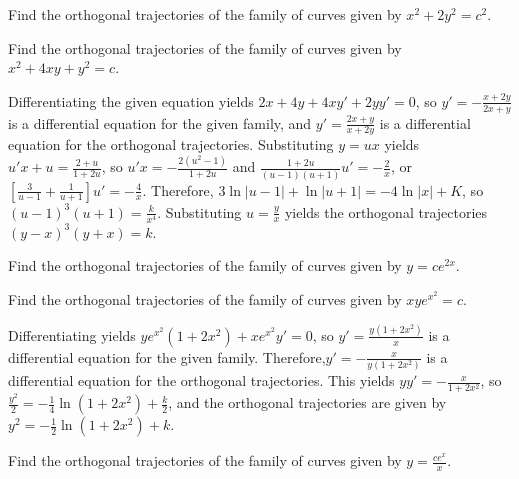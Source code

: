 \documentclass{ximera}
\begin{document}
\begin{problem}\label{exer:4.5.25} Find the
orthogonal trajectories of the family of curves given by $x^2+2y^2=c^2$.
\end{problem}

\begin{problem}\label{exer:4.5.26} Find the
orthogonal trajectories of the family of curves given by $x^2+4xy+y^2=c$.

\begin{solution}
Differentiating the given equation yields $2x+4y+4xy'+2yy'=0$, so
$y'=-\frac{x+2y}{2x+y}$ is a differential equation for the given
family, and $y'=\frac{2x+y}{x+2y}$ is a differential equation
for the orthogonal trajectories. Substituting $y=ux$ yields
$u'x+u=\frac{2+u}{1+2u}$, so $u'x=-\frac{2(u^2-1)}{1+2u}$ and
$\frac{1+2u}{(u-1)(u+1)}u'=-\frac{2}{x}$, or $\left[\frac{3}{u-1}+\frac{1}{u+1}\right]u'=-\frac{4}{x}$. Therefore,
$3\ln|u-1|+\ln|u+1|=-4\ln|x|+K$, so $(u-1)^3(u+1)=\frac{k}{x^4}$.
Substituting $u=\frac{y}{x}$ yields the orthogonal trajectories
$(y-x)^3(y+x)=k$.
\end{solution}
\end{problem}

\begin{problem}\label{exer:4.5.27} Find the
orthogonal trajectories of the family of curves given by $y=ce^{2x}$.
\end{problem}

\begin{problem}\label{exer:4.5.28} Find the
orthogonal trajectories of the family of curves given by $xye^{x^2}=c$.

\begin{solution}
Differentiating yields $ye^{x^2}(1+2x^2)+xe^{x^2}y'=0$, so
$y'=\frac{y(1+2x^2)}{x}$ is a differential equation for the given
family. Therefore,$y'=-\frac{x}{y(1+2x^2)}$ is a differential
equation for the orthogonal trajectories. This yields
$yy'=-\frac{x}{1+2x^2}$, so
$\frac{y^2}{2}=-\frac{1}{4}\ln(1+2x^2)+\frac{k}{2}$, and the
orthogonal trajectories are given by
$y^2=-\frac{1}{2}\ln(1+2x^2)+k$.
\end{solution}
\end{problem}

\begin{problem}\label{exer:4.5.29}
Find the
orthogonal trajectories of the family of curves given by $y=\frac{ce^x}{x}$.
\end{problem}
\end{document}
